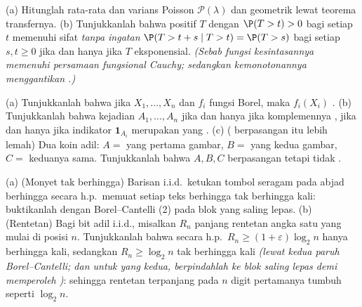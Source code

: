 \begin{exercise}[$\star$]\label{exo:b3:probability:2}
(a) Hitunglah rata-rata dan varians  Poisson $\mathcal
P(\lambda)$ dan geometrik lewat teorema transfernya.
(b) Tunjukkanlah bahwa  positif $T$ dengan $\P(T > t)
> 0$ bagi setiap $t$ memenuhi sifat \emph{tanpa ingatan} $\P(T > t + s \mid
T > t) = \P(T > s)$ bagi setiap $s, t \geq 0$ jika dan hanya jika $T$
eksponensial. \emph{(Sebab fungsi kesintasannya memenuhi persamaan
fungsional Cauchy; sedangkan kemonotonannya menggantikan .)}
\end{exercise}

\begin{exercise}[$\star\star$]\label{exo:b3:probability:3}
(a) Tunjukkanlah bahwa jika $X_1, \dots, X_n$  dan $f_i$
fungsi Borel, maka $f_i(X_i)$ .
(b) Tunjukkanlah bahwa kejadian $A_1, \dots, A_n$  jika dan hanya jika
komplemennya , jika dan hanya jika indikator $\mathbf 1_{A_i}$
merupakan  yang .
(c) ( berpasangan itu lebih lemah) Dua koin adil: $A =$ yang pertama
gambar, $B =$ yang kedua gambar, $C =$ keduanya sama. Tunjukkanlah bahwa
$A, B, C$  berpasangan tetapi tidak .
\end{exercise}

\begin{exercise}[$\star\star$]\label{exo:b3:probability:4}
(a) (Monyet tak berhingga) Barisan i.i.d.\ ketukan tombol seragam
pada abjad berhingga secara h.p.\ memuat setiap teks berhingga
tak berhingga kali: buktikanlah dengan Borel--Cantelli (2) pada
blok yang saling lepas.
(b) (Rentetan) Bagi bit adil i.i.d., misalkan $R_n$ panjang
rentetan angka satu yang mulai di posisi $n$. Tunjukkanlah bahwa secara h.p.\
$R_n \geq (1+\varepsilon)\log_2n$ hanya berhingga kali, sedangkan $R_n
\geq \log_2 n$ tak berhingga kali \emph{(lewat kedua paruh
Borel--Cantelli; dan untuk yang kedua, berpindahlah ke blok saling lepas demi
memperoleh \omterm{def:b3:probability:independence}{kebebasan})}: sehingga rentetan terpanjang pada $n$ digit pertamanya
tumbuh seperti $\log_2n$.
\end{exercise}

